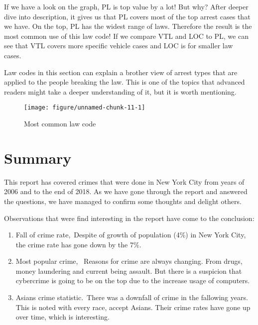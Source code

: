 \documentclass{article}\usepackage[]{graphicx}\usepackage[]{color}
\makeatletter
\def\maxwidth{ %
  \ifdim\Gin@nat@width>\linewidth
    \linewidth
  \else
    \Gin@nat@width
  \fi
}
\newenvironment{knitrout}{}{} %
\makeatother
\begin{document}
        If we have a look on the graph, PL is top value by a lot! But why? After deeper dive into                 description, it gives us that PL covers most of the top arrest cases that we have. On the top, PL         has the widest range of laws. Therefore the result is the most common use of this law code! If we         compare VTL and LOC to PL, we can see that VTL covers more specific vehicle cases and LOC is for          smaller law cases.\

        Law codes in this section can explain a brother view of arrest types that are applied to the              people breaking the law. This is one of the topics that advanced readers might take a deeper              understanding of it, but it is worth mentioning.


        \begin{figure}[hbtp]
          \caption{Most common law code}
\begin{knitrout}
\color{fgcolor}
\texttt{[image: figure/unnamed-chunk-11-1]} 

\end{knitrout}
        \end{figure}

  \maketitle
    \newpage
      \section{Summary}
      This report has covered crimes that were done in New York City from years of 2006 and to the end of       2018. As we have gone through the report and answered the questions, we have managed to confirm some       thoughts and delight others.\
      
      Observations that were find interesting in the report have come to the conclusion:
      \begin{enumerate}
        \item
            Fall of crime rate,\
      	    Despite of growth of population (4\%) in New York City, the crime rate has gone down by the               7\%.
        \item
            Most popular crime, \
            Reasons for crime are always changing. From drugs, money laundering and current being assault.             But there is a suspicion that cybercrime is going to be on the top due to the increase usage              of computers.
        \item
            Asians crime statistic.\
            There was a downfall of crime in the fallowing years. This is noted with every race, accept               Asians. Their crime rates have gone up over time, which is interesting.

      \end{enumerate}
      
\end{document}
